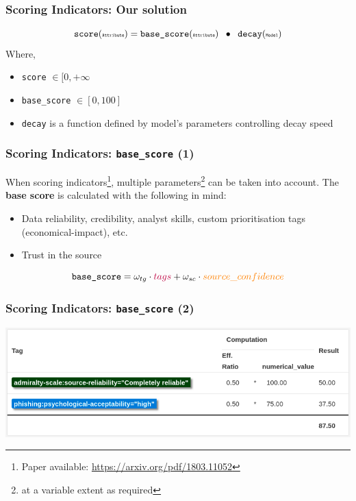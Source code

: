 \begin{frame}
    \frametitle{Scoring Indicators: Our solution}
    $$ \texttt{score}(\texttt{\tiny Attribute}) = \texttt{base\_score}(\texttt{\tiny Attribute}) \;\;\bullet\;\; \texttt{decay}(\texttt{\tiny Model}) $$
    Where,\vspace{0.5cm}
    \begin{itemize}
        \item \texttt{score} $ \in [0, +\infty $
        \item \texttt{base\_score} $ \in [0, 100] $
        \item \texttt{decay} is a function defined by model's parameters controlling decay speed
    \end{itemize}
    
\end{frame}

\begin{frame}
    \frametitle{Scoring Indicators: \texttt{base\_score} (1)}
        When scoring indicators\footnote{Paper available: \url{https://arxiv.org/pdf/1803.11052}}, multiple parameters\footnote{at a variable extent as required} can be taken into account. The {\bf base score} is calculated with the following in mind:
    \begin{itemize}
        \item {\color{purple}Data reliability, credibility, analyst skills, custom prioritisation tags (economical-impact), etc.}
        \item {\color{orange}Trust in the source}
    \end{itemize}
    \vspace{0.5cm}
    $$\texttt{base\_score} = \omega_{tg} \cdot {\color{purple}tags} + \omega_{sc} \cdot {\color{orange}source\_confidence}$$
\end{frame}

\begin{frame}
    \frametitle{Scoring Indicators: \texttt{base\_score} (2)}
    \includegraphics[width=1.0\linewidth]{pics/bs-computation-steps.png}
\end{frame}

